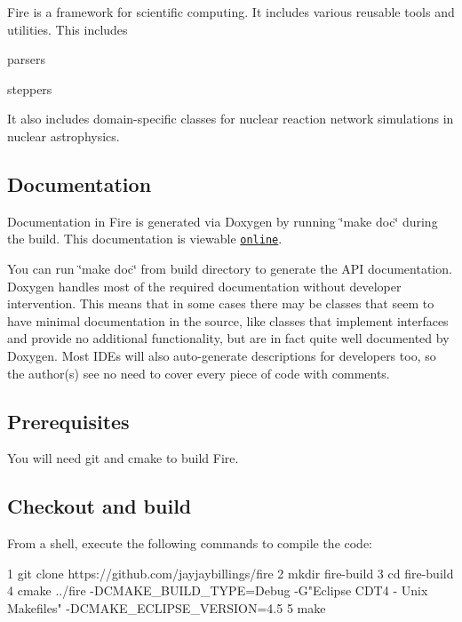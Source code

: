 Fire is a framework for scientific computing. It includes various reusable tools and utilities. This includes
\begin{DoxyItemize}
\item parsers
\item steppers
\end{DoxyItemize}

It also includes domain-\/specific classes for nuclear reaction network simulations in nuclear astrophysics.

\subsection*{Documentation}

Documentation in Fire is generated via Doxygen by running \char`\"{}make doc\char`\"{} during the build. This documentation is viewable \href{http://www.jayjaybillings.com/fire}{\tt online}.

You can run \char`\"{}make doc\char`\"{} from build directory to generate the A\+PI documentation. Doxygen handles most of the required documentation without developer intervention. This means that in some cases there may be classes that seem to have minimal documentation in the source, like classes that implement interfaces and provide no additional functionality, but are in fact quite well documented by Doxygen. Most I\+D\+Es will also auto-\/generate descriptions for developers too, so the author(s) see no need to cover every piece of code with comments.

\subsection*{Prerequisites}

You will need git and cmake to build Fire.

\subsection*{Checkout and build}

From a shell, execute the following commands to compile the code\+:


\begin{DoxyCode}
1 git clone https://github.com/jayjaybillings/fire
2 mkdir fire-build
3 cd fire-build
4 cmake ../fire -DCMAKE\_BUILD\_TYPE=Debug -G"Eclipse CDT4 - Unix Makefiles" -DCMAKE\_ECLIPSE\_VERSION=4.5
5 make
\end{DoxyCode}


